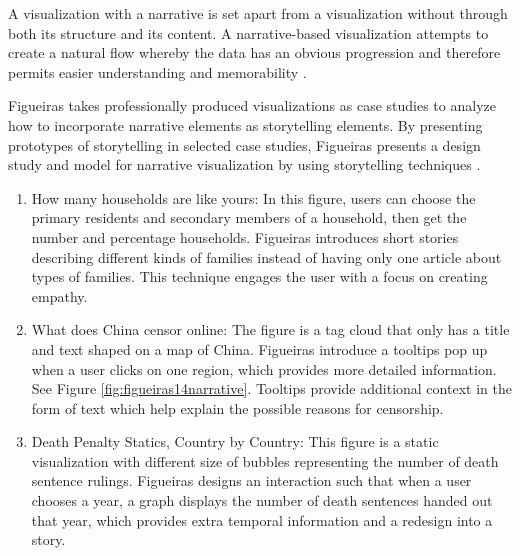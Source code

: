 \documentclass{egpubl}
\begin{document}
A visualization with a narrative is set apart from a visualization without through both its structure and its content. A narrative-based visualization attempts to create a natural flow whereby the data has an obvious progression and therefore permits easier understanding and memorability \cite{figueiras}.

Figueiras takes professionally produced visualizations as case studies to analyze how to incorporate narrative elements as storytelling elements. By presenting prototypes of storytelling in selected case studies, Figueiras presents a design study and model for narrative visualization by using storytelling techniques \cite{figueiras}.
\begin{enumerate}
\item How many households are like yours: In this figure, users can choose the primary residents and secondary members of a household, then get the number and percentage households. Figueiras \cite{figueiras} introduces short stories describing different kinds of families instead of having only one article about types of families. This technique engages the user with a focus on creating empathy.
\item What does China censor online: The figure is a tag cloud that only has a title and text shaped on a map of China. Figueiras \cite{figueiras} introduce a tooltips pop up when a user clicks on one region, which provides more detailed information. See Figure \ref{fig:figueiras14narrative}. Tooltips provide additional context in the form of text which help explain the possible reasons for censorship. 
\item Death Penalty Statics, Country by Country: This figure is a static visualization with different size of bubbles representing the number of death sentence rulings. Figueiras \cite{figueiras} designs an interaction such that when a user chooses a year, a graph displays the number of death sentences handed out that year, which provides extra temporal information and a redesign into a story. 
\end{enumerate}
\end{document}

